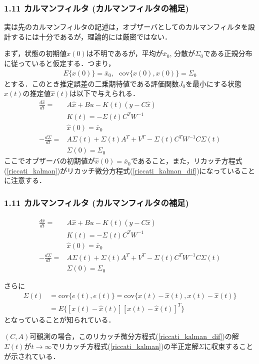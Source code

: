 \documentclass[10pt]{beamer}
\begin{document}
\begin{frame}[t]
\frametitle{1.11 カルマンフィルタ (カルマンフィルタの補足)}
実は先のカルマンフィルタの記述は，オブザーバとしてのカルマンフィルタを設計するには十分であるが，理論的には厳密ではない．

まず，状態の初期値$x(0)$は不明であるが，平均が$\bar{x}_0$, 分散が$\Sigma_0$である正規分布に従っていると仮定する．つまり，
\begin{align}
     E\{x(0) \} = \bar{x}_0, \ \ \ \mbox{cov} \{ x(0), x(0) \} = \Sigma_0
\end{align}
とする．このとき推定誤差の二乗期待値である評価関数$J_0$を最小にする状態$x(t)$の推定値$\hat{x}(t)$は以下で与えられる．
\begin{align}
 \frac{d \hat{x}}{dt} =& A \hat{x} + B u - K(t) (y - C \hat{x})
\\
 & K(t) = - \Sigma(t) C^T W^{-1}
\\
 & \hat{x}(0) = \bar{x}_0
\\
 - \frac{d \Sigma}{dt} = & A \Sigma(t) + \Sigma(t) A^T +  V ^T - \Sigma(t) C^T W^{-1} C \Sigma(t)

\\
 & \Sigma(0) = \Sigma_0
\end{align}
ここでオブザーバの初期値が$\hat{x}(0)=\bar{x}_0$であること，また，リカッチ方程式(\ref{riccati_kalman})がリカッチ微分方程式(\ref{riccati_kalman_dif})になっていることに注意する．

\end{frame}


\begin{frame}[t]
\frametitle{1.11 カルマンフィルタ (カルマンフィルタの補足)}
 

\addtocounter{equation}{-5}
\begin{align}
 \frac{d \hat{x}}{dt} =& A \hat{x} + B u - K(t) (y - C \hat{x})
\\
 & K(t) = - \Sigma(t) C^T W^{-1}
\\
 & \hat{x}(0) = \bar{x}_0
\\
 - \frac{d \Sigma}{dt} = & A \Sigma(t) + \Sigma(t) A^T +  V ^T - \Sigma(t) C^T W^{-1} C \Sigma(t)

\\
 & \Sigma(0) = \Sigma_0
\end{align}

さらに
\begin{align}
     \Sigma(t) &= \mbox{cov} \{ e(t), e(t) \} = \mbox{cov} \{ x(t)-\hat{x}(t),  x(t)-\hat{x}(t)\}
\nonumber\\
     &= E \{ [x(t)-\hat{x}(t)][x(t)-\hat{x}(t)]^T \}
\end{align}
となっていることが知られている．


$(C,A)$可観測の場合，このリカッチ微分方程式(\ref{riccati_kalman_dif})の解$\Sigma(t)$が$t \rightarrow \infty$でリカッチ方程式(\ref{riccati_kalman})の半正定解$\Sigma$に収束することが示されている．
\end{frame}
\end{document}
